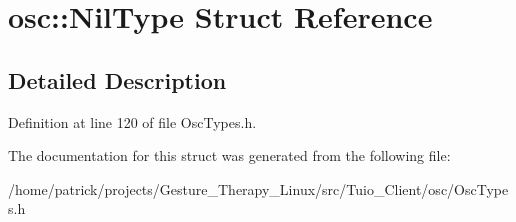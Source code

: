 \hypertarget{structosc_1_1_nil_type}{}\section{osc\+:\+:Nil\+Type Struct Reference}
\label{structosc_1_1_nil_type}


\subsection{Detailed Description}


Definition at line 120 of file Osc\+Types.\+h.



The documentation for this struct was generated from the following file\+:\begin{DoxyCompactItemize}
\item 
/home/patrick/projects/\+Gesture\+\_\+\+Therapy\+\_\+\+Linux/src/\+Tuio\+\_\+\+Client/osc/Osc\+Types.\+h\end{DoxyCompactItemize}
